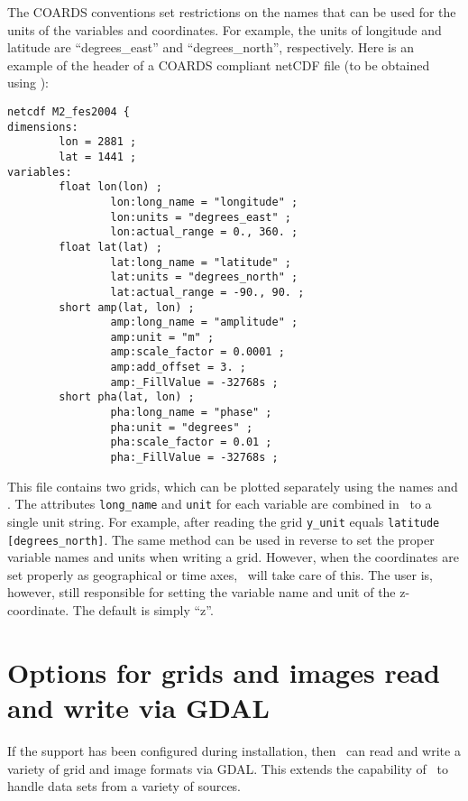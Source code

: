 The COARDS conventions set restrictions on the names that can be used for the units of the variables
and coordinates. For example, the units of longitude and latitude are ``degrees\_east'' and ``degrees\_north'',
respectively. Here is an example of the header of a COARDS compliant netCDF file (to be obtained using
):
\begin{verbatim}
netcdf M2_fes2004 {
dimensions:
        lon = 2881 ;
        lat = 1441 ;
variables:
        float lon(lon) ;
                lon:long_name = "longitude" ;
                lon:units = "degrees_east" ;
                lon:actual_range = 0., 360. ;
        float lat(lat) ;
                lat:long_name = "latitude" ;
                lat:units = "degrees_north" ;
                lat:actual_range = -90., 90. ;
        short amp(lat, lon) ;
                amp:long_name = "amplitude" ;
                amp:unit = "m" ;
                amp:scale_factor = 0.0001 ;
                amp:add_offset = 3. ;
                amp:_FillValue = -32768s ;
        short pha(lat, lon) ;
                pha:long_name = "phase" ;
                pha:unit = "degrees" ;
                pha:scale_factor = 0.01 ;
                pha:_FillValue = -32768s ;
\end{verbatim}
This file contains two grids, which can be plotted separately using the names 
and . The attributes \verb|long_name| and \verb|unit| for each variable are
combined in \GMT\ to a single unit string. For example, after reading the grid \verb|y_unit| equals
\verb|latitude [degrees_north]|. The same method can be used in reverse to set the proper variable names
and units when writing a grid. However, when the coordinates are set properly as geographical or time axes,
\GMT\ will take care of this. The user is, however, still responsible for setting the variable name and
unit of the z-coordinate. The default is simply ``z''.


\section{Options for grids and images read and write via GDAL}
\label{sec:GDAL}

If the support has been configured during installation, then \GMT\ can read and write a variety
of grid and image formats via GDAL. This extends the capability of \GMT\ to handle
data sets from a variety of sources.

